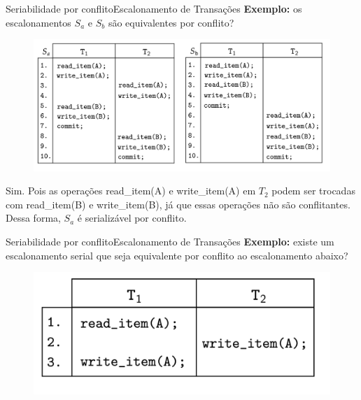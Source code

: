 \documentclass[t]{beamer}
\begin{document}
\begin{ftst}{Seriabilidade por conflito}{Escalonamento de Transações}
\textbf{Exemplo:} os escalonamentos $S_a$ e $S_b$ são equivalentes por conflito?

\begin{figure}
    \centering
    \includegraphics[scale=0.13]{Figuras_transacoes/15.png}
\end{figure}
\small
Sim. Pois as operações read\_item(A) e write\_item(A) em $T_2$ podem ser trocadas com read\_item(B) e write\_item(B), já que essas operações não são conflitantes. Dessa forma, $S_a$ é serializável por conflito.

\end{ftst}


\begin{ftst}{Seriabilidade por conflito}{Escalonamento de Transações}
\textbf{Exemplo:} existe um escalonamento serial que seja equivalente por conflito ao escalonamento abaixo?

\begin{figure}
    \centering
    \includegraphics[scale=0.13]{Figuras_transacoes/16.png}
\end{figure}

\end{ftst}

\end{document}
